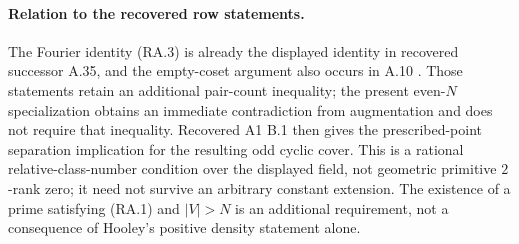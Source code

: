 \paragraph{Relation to the recovered row statements.}
The Fourier identity (RA.3) is already the displayed
identity in recovered successor A.35, and the empty-coset
argument also occurs in A.10 \cite[A.10 and A.35]{ASrun}.
Those statements retain an additional pair-count
inequality; the present even-$N$ specialization obtains
an immediate contradiction from augmentation and does
not require that inequality.
Recovered A1 B.1 then gives the prescribed-point
separation implication for the resulting odd cyclic cover.
This is a rational relative-class-number condition over
the displayed field, not geometric primitive $2$-rank
zero; it need not survive an arbitrary constant extension.
The existence of a prime satisfying (RA.1) and $|V|>N$
is an additional requirement, not a consequence of
Hooley's positive density statement alone.
